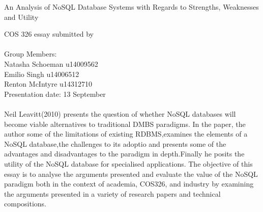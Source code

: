 \documentclass[12pt]{article}
\begin{document}
\begin{titlepage}

\begin{center}
\begin{Huge}
An Analysis of NoSQL Database Systems with Regards to Strengths, Weaknesses and Utility
\begin{large}
\begin{center}
COS 326 essay submitted by
\\
\\
Group Members:\\
Natasha Schoeman u14009562
\\
Emilio Singh u14006512
\\
Renton McIntyre u14312710
\\
Presentation date: 13 September

\end{center}
\end{large}
\end{Huge}

\end{center}
\end{titlepage}
\pagebreak

\paragraph{}
Neil Leavitt(2010) presents the question of whether NoSQL databases will become viable alternatives to traditional DMBS paradigms. In the paper, the author some of the limitations of existing RDBMS,examines the elements of a NoSQL database,the challenges to its adoptio and presents some of the advantages and disadvantages to the paradigm in depth.Finally he posits the utility of the NoSQL database for specialised applications. The objective of this essay is to analyse the arguments presented and evaluate the value of the NoSQL paradigm both in the context of academia, COS326, and industry by examining the arguments presented in a variety of research papers and technical compositions.
\end{document}
